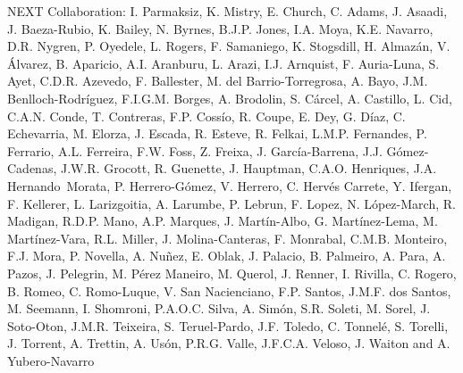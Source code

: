 NEXT Collaboration: I. Parmaksiz, K. Mistry, E. Church, C. Adams, J. Asaadi, J. Baeza-Rubio, K. Bailey, N. Byrnes, B.J.P. Jones, I.A. Moya, K.E. Navarro, D.R. Nygren, P. Oyedele, L. Rogers, F. Samaniego, K. Stogsdill, H. Almaz\'an, V. \'Alvarez, B. Aparicio, A.I. Aranburu, L. Arazi, I.J. Arnquist, F. Auria-Luna, S. Ayet, C.D.R. Azevedo, F. Ballester, M. del Barrio-Torregrosa, A. Bayo, J.M. Benlloch-Rodr\'{i}guez, F.I.G.M. Borges, A. Brodolin, S. C\'arcel, A. Castillo, L. Cid, C.A.N. Conde, T. Contreras, F.P. Coss\'io, R. Coupe, E. Dey, G. D\'iaz, C. Echevarria, M. Elorza, J. Escada, R. Esteve, R. Felkai, L.M.P. Fernandes, P. Ferrario, A.L. Ferreira, F.W. Foss, Z. Freixa, J. Garc\'ia-Barrena, J.J. G\'omez-Cadenas, J.W.R. Grocott, R. Guenette, J. Hauptman, C.A.O. Henriques, J.A. Hernando~Morata, P. Herrero-G\'omez, V. Herrero, C. Herv\'es Carrete, Y. Ifergan, F. Kellerer, L. Larizgoitia, A. Larumbe, P. Lebrun, F. Lopez, N. L\'opez-March, R. Madigan, R.D.P. Mano, A.P. Marques, J. Mart\'in-Albo, G. Mart\'inez-Lema, M. Mart\'inez-Vara, R.L. Miller, J. Molina-Canteras, F. Monrabal, C.M.B. Monteiro, F.J. Mora, P. Novella, A. Nu\~{n}ez, E. Oblak, J. Palacio, B. Palmeiro, A. Para, A. Pazos, J. Pelegrin, M. P\'erez Maneiro, M. Querol, J. Renner, I. Rivilla, C. Rogero, B. Romeo, C. Romo-Luque, V. San Nacienciano, F.P. Santos, J.M.F. dos Santos, M. Seemann, I. Shomroni, P.A.O.C. Silva, A. Sim\'on, S.R. Soleti, M. Sorel, J. Soto-Oton, J.M.R. Teixeira, S. Teruel-Pardo, J.F. Toledo, C. Tonnel\'e, S. Torelli, J. Torrent, A. Trettin, A. Us\'on, P.R.G. Valle, J.F.C.A. Veloso, J. Waiton and A. Yubero-Navarro
